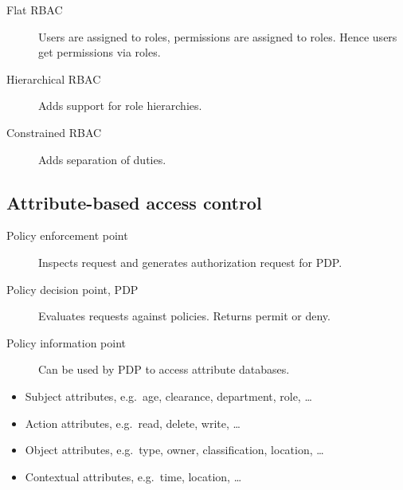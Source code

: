 \begin{frame}
  \begin{description}
    \item[Flat RBAC] Users are assigned to roles, permissions are assigned to 
      roles.
      Hence users get permissions via roles.

    \item[Hierarchical RBAC]
      Adds support for role hierarchies.

    \item[Constrained RBAC]
      Adds separation of duties.
  \end{description}
\end{frame}

\subsection{Attribute-based access control}

\begin{frame}
  \begin{definition}
    \begin{description}
      \item[Policy enforcement point] Inspects request and generates 
        authorization request for PDP.
      \item[Policy decision point, PDP] Evaluates requests against policies.
        Returns permit or deny.
      \item[Policy information point] Can be used by PDP to access attribute 
        databases.
    \end{description}
  \end{definition}
\end{frame}

\begin{frame}
  \begin{example}[Attributes]
    \begin{itemize}
      \item Subject attributes, e.g.\ age, clearance, department, role, \dots
      \item Action attributes, e.g.\ read, delete, write, \dots
      \item Object attributes, e.g.\ type, owner, classification, location, 
        \dots
      \item Contextual attributes, e.g.\ time, location, \dots
    \end{itemize}
  \end{example}
\end{frame}

